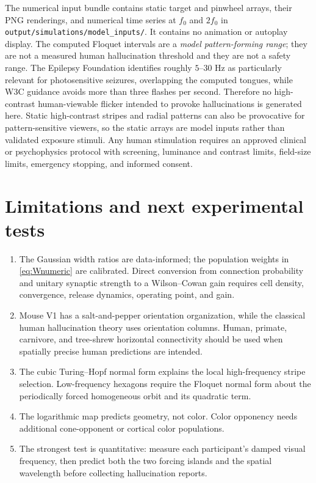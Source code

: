 \documentclass[11pt]{article}
\begin{document}
The numerical input bundle contains static target and pinwheel arrays, their
PNG renderings, and numerical time series at $f_0$ and $2f_0$ in
\texttt{output/simulations/model\_inputs/}.  It contains no animation or
autoplay display.  The computed Floquet intervals are a \emph{model
pattern-forming range}; they are not a measured human hallucination threshold
and they are not a safety range.  The Epilepsy Foundation identifies roughly
$5$--$30$ Hz as particularly relevant for photosensitive seizures, overlapping
the computed tongues, while W3C guidance avoids more than three flashes per
second.  Therefore no high-contrast human-viewable flicker intended to provoke
hallucinations is generated here.  Static high-contrast stripes and radial
patterns can also be provocative for pattern-sensitive viewers, so the static
arrays are model inputs rather than validated exposure stimuli.  Any human
stimulation requires an approved
clinical or psychophysics protocol with screening, luminance and contrast
limits, field-size limits, emergency stopping, and informed consent.

\section{Limitations and next experimental tests}

\begin{enumerate}[label=\arabic*.]
 \item The Gaussian width ratios are data-informed; the population weights in
 \eqref{eq:Wnumeric} are calibrated.  Direct conversion from connection
 probability and unitary synaptic strength to a Wilson--Cowan gain requires
 cell density, convergence, release dynamics, operating point, and gain.
 \item Mouse V1 has a salt-and-pepper orientation organization, while the
 classical human hallucination theory uses orientation columns.  Human,
 primate, carnivore, and tree-shrew horizontal connectivity should be used
 when spatially precise human predictions are intended.
 \item The cubic Turing--Hopf normal form explains the local high-frequency
 stripe selection.  Low-frequency hexagons require the Floquet normal form
 about the periodically forced homogeneous orbit and its quadratic term.
 \item The logarithmic map predicts geometry, not color.  Color opponency needs
 additional cone-opponent or cortical color populations.
 \item The strongest test is quantitative: measure each participant's damped
 visual frequency, then predict both the two forcing islands and the spatial
 wavelength before collecting hallucination reports.
\end{enumerate}
\end{document}
